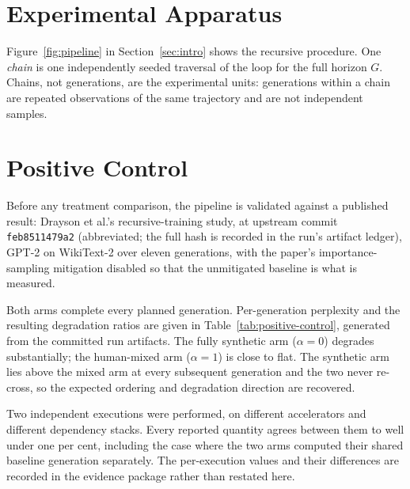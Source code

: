 \appendix

\section{Experimental Apparatus}
\label{app:apparatus}

Figure~\ref{fig:pipeline} in Section~\ref{sec:intro} shows the recursive procedure. One
\emph{chain} is one independently seeded traversal of the loop for the full horizon $G$.
Chains, not generations, are the experimental units: generations within a chain are repeated
observations of the same trajectory and are not independent samples.

\section{Positive Control}
\label{app:positive-control}

Before any treatment comparison, the pipeline is validated against a published result:
Drayson et al.'s recursive-training study, at upstream commit
\texttt{feb8511479a2} (abbreviated; the full hash is recorded in the run's artifact ledger), GPT-2 on WikiText-2 over eleven
generations, with the paper's importance-sampling mitigation disabled so that the
unmitigated baseline is what is measured.

Both arms complete every planned generation. Per-generation perplexity and the resulting
degradation ratios are given in Table~\ref{tab:positive-control}, generated from the
committed run artifacts. The fully synthetic arm ($\alpha=0$) degrades substantially; the
human-mixed arm ($\alpha=1$) is close to flat. The synthetic arm lies above the mixed arm at
every subsequent generation and the two never re-cross, so the expected ordering and
degradation direction are recovered.

\begin{table}[h]
\centering
\caption{Positive-control perplexity by generation, both arms, generated from the committed
per-arm result artifacts.}
\label{tab:positive-control}

\end{table}

Two independent executions were performed, on different accelerators and different
dependency stacks. Every reported quantity agrees between them to well under one per cent,
including the case where the two arms computed their shared baseline generation separately.
The per-execution values and their differences are recorded in the evidence package rather
than restated here.


